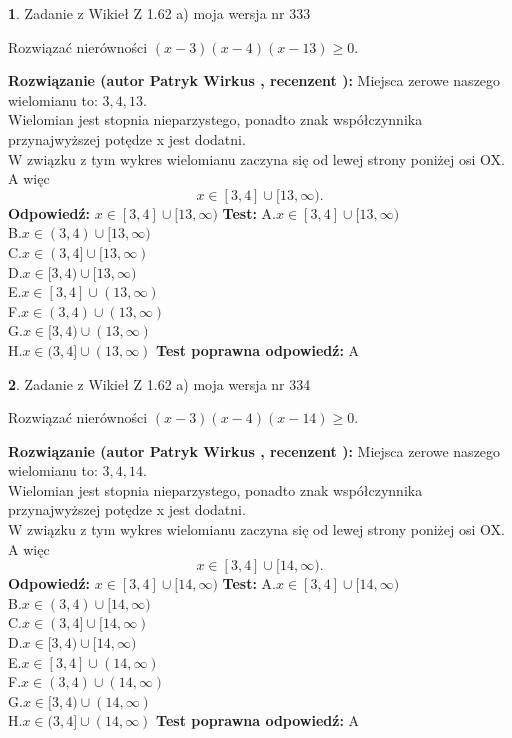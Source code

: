 \documentclass[12pt, a4paper]{article}
\theoremstyle{definition} %
\newtheorem{zad}{}
\newcommand{\zadStart}[1]{\begin{zad}#1\newline}
\newcommand{\zadStop}{\end{zad}}
\newcommand{\rozwStart}[2]{\noindent \textbf{Rozwiązanie (autor #1 , recenzent #2): }\newline}
\newcommand{\rozwStop}{\newline}
\newcommand{\odpStart}{\noindent \textbf{Odpowiedź:}\newline}
\newcommand{\odpStop}{\newline}
\newcommand{\testStart}{\noindent \textbf{Test:}\newline}
\newcommand{\testStop}{\newline}
\newcommand{\kluczStart}{\noindent \textbf{Test poprawna odpowiedź:}\newline}
\newcommand{\kluczStop}{\newline}
\begin{document}
\zadStart{Zadanie z Wikieł Z 1.62 a) moja wersja nr 333}

Rozwiązać nierówności $(x-3)(x-4)(x-13)\ge0$.
\zadStop
\rozwStart{Patryk Wirkus}{}
Miejsca zerowe naszego wielomianu to: $3, 4, 13$.\\
Wielomian jest stopnia nieparzystego, ponadto znak współczynnika przy\linebreak najwyższej potędze x jest dodatni.\\ W związku z tym wykres wielomianu zaczyna się od lewej strony poniżej osi OX. A więc $$x \in [3,4] \cup [13,\infty).$$
\rozwStop
\odpStart
$x \in [3,4] \cup [13,\infty)$
\odpStop
\testStart
A.$x \in [3,4] \cup [13,\infty)$\\
B.$x \in (3,4) \cup [13,\infty)$\\
C.$x \in (3,4] \cup [13,\infty)$\\
D.$x \in [3,4) \cup [13,\infty)$\\
E.$x \in [3,4] \cup (13,\infty)$\\
F.$x \in (3,4) \cup (13,\infty)$\\
G.$x \in [3,4) \cup (13,\infty)$\\
H.$x \in (3,4] \cup (13,\infty)$
\testStop
\kluczStart
A
\kluczStop



\zadStart{Zadanie z Wikieł Z 1.62 a) moja wersja nr 334}

Rozwiązać nierówności $(x-3)(x-4)(x-14)\ge0$.
\zadStop
\rozwStart{Patryk Wirkus}{}
Miejsca zerowe naszego wielomianu to: $3, 4, 14$.\\
Wielomian jest stopnia nieparzystego, ponadto znak współczynnika przy\linebreak najwyższej potędze x jest dodatni.\\ W związku z tym wykres wielomianu zaczyna się od lewej strony poniżej osi OX. A więc $$x \in [3,4] \cup [14,\infty).$$
\rozwStop
\odpStart
$x \in [3,4] \cup [14,\infty)$
\odpStop
\testStart
A.$x \in [3,4] \cup [14,\infty)$\\
B.$x \in (3,4) \cup [14,\infty)$\\
C.$x \in (3,4] \cup [14,\infty)$\\
D.$x \in [3,4) \cup [14,\infty)$\\
E.$x \in [3,4] \cup (14,\infty)$\\
F.$x \in (3,4) \cup (14,\infty)$\\
G.$x \in [3,4) \cup (14,\infty)$\\
H.$x \in (3,4] \cup (14,\infty)$
\testStop
\kluczStart
A
\kluczStop
\end{document}
